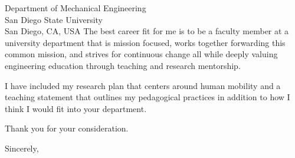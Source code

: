 \documentclass{letter}
\begin{document}
\begin{letter}{
  Department of Mechanical Engineering \\
  San Diego State University \\
  San Diego, CA, USA
}
The best career fit for me is to be a faculty member at a university department
that is mission focused, works together forwarding this common mission, and
strives for continuous change all while deeply valuing engineering education
through teaching and research mentorship.

I have included my research plan that centers around human mobility and a
teaching statement that outlines my pedagogical practices in addition to how I
think I would fit into your department.

Thank you for your consideration.

\closing{Sincerely,}

\end{letter}
\end{document}
